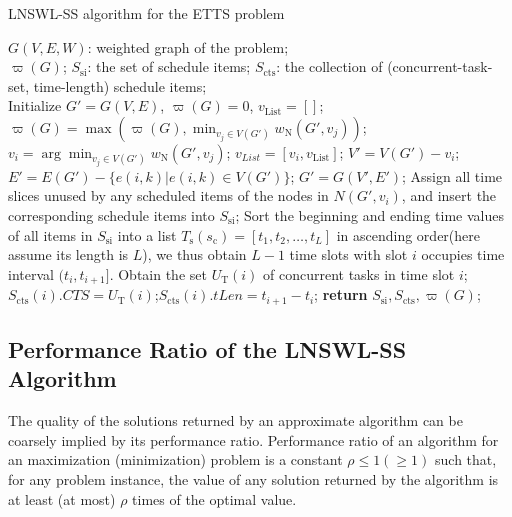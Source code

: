 \documentclass[journal,10pt]{IEEEtran}
\begin{document}
\begin{algorithm}[!htb]
\caption{LNSWL-SS algorithm for the ETTS problem}
\begin{algorithmic}[1]\label{Alg_LNSWL_SS}
    \REQUIRE $G(V,E,W)$: weighted graph of the problem;\\
    \ENSURE $\varpi(G)$; $S_\text{si}$: the set of schedule items;
    $S_\text{cts}$: the collection of (concurrent-task-set, time-length) schedule items;\\
    \STATE Initialize $G'{=}G(V,E)$, $\varpi(G){=}0$, $v_\text{List}{=}[ ]$;
    \label{seqbegin}
        \STATE $\varpi(G){=}\max(\varpi(G),\min_{v_j{\in}V(G')}w_\text{N}(G',v_j))$;\label{v_update}
        \STATE $v_i{=}\arg\min_{v_j{\in}V(G')}w_\text{N}(G',v_j)$; $v_{List}=[v_i,v_\text{List}]$;
        \STATE $V'{=}V(G'){-}v_i$; $E'{=}E(G'){-}\{e(i,k)|e(i,k){\in}V(G')\}$;
        \STATE $G'{=}G(V',E')$;
    \ENDWHILE \label{seqend}
     \label{schbegin}
        \STATE Assign all time slices unused by any scheduled items of the nodes in $N(G',v_i)$, and insert the corresponding schedule items into $S_\text{si}$;
    \ENDFOR \label{schend}
    \STATE Sort the beginning and ending time values of all items in $S_\text{si}$ into a list $T_\text{s}(s_\text{c}){=}[t_1,t_2,\ldots,t_{L}]$ in ascending order(here assume its length is $L$), we thus obtain $L{-}1$ time slots with slot $i$ occupies time interval $(t_{i},t_{i{+}1}]$.\label{ctsbegin}
        \STATE Obtain the set $U_\text{T}(i)$ of concurrent tasks in time slot $i$;
        \STATE $S_\text{cts}(i).CTS{=}U_\text{T}(i)$;$S_\text{cts}(i).tLen{=}t_{i{+}1}{-}t_{i}$;
    \ENDFOR \label{ctsend}
    \STATE \textbf{return} $S_\text{si}, S_\text{cts}, \varpi(G)$;
\end{algorithmic}
\end{algorithm}

\subsection{Performance Ratio of the LNSWL-SS Algorithm}

The quality of the solutions returned by an approximate algorithm can be coarsely implied by its performance ratio. Performance ratio of an algorithm for an maximization (minimization) problem is a constant $\rho{\leq}1({\geq}1)$ such that, for any problem instance, the value of any solution returned by the algorithm is at least (at most) ${\rho}$ times of the optimal value.
\end{document}
